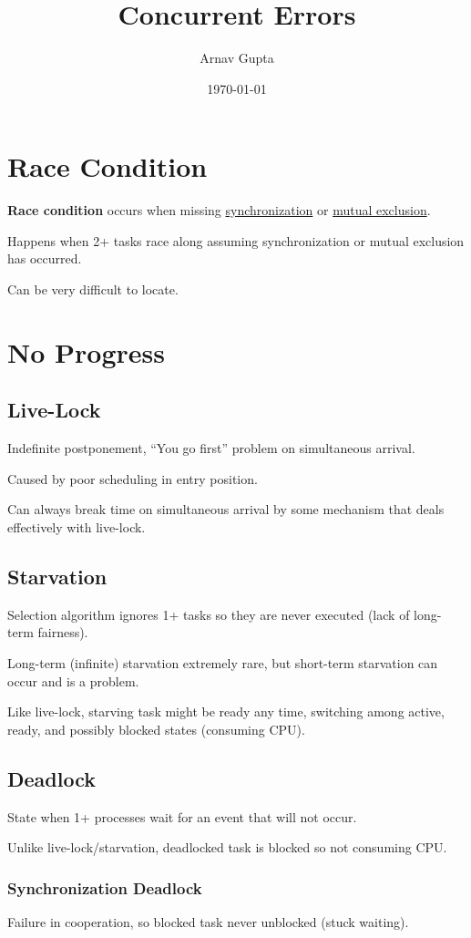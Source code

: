 \documentclass[11pt]{article}
\author{Arnav Gupta}
\date{\today}
\title{Concurrent Errors}
\begin{document}
\maketitle
\tableofcontents

\section{Race Condition}
\label{sec:org1addb70}
\textbf{Race condition} occurs when missing \uline{synchronization} or \uline{mutual exclusion}.

Happens when 2+ tasks race along assuming synchronization or mutual exclusion has occurred.

Can be very difficult to locate.
\section{No Progress}
\label{sec:orgc2e5e05}
\subsection{Live-Lock}
\label{sec:org8a3eda5}
Indefinite postponement, ``You go first'' problem on simultaneous arrival.

Caused by poor scheduling in entry position.

Can always break time on simultaneous arrival by some mechanism that deals effectively with
live-lock.
\subsection{Starvation}
\label{sec:org490fb36}
Selection algorithm ignores 1+ tasks so they are never executed (lack of long-term fairness).

Long-term (infinite) starvation extremely rare, but short-term starvation can occur and is a problem.

Like live-lock, starving task might be ready any time, switching among active, ready, and possibly
blocked states (consuming CPU).
\subsection{Deadlock}
\label{sec:org8567ccf}
State when 1+ processes wait for an event that will not occur.

Unlike live-lock/starvation, deadlocked task is blocked so not consuming CPU.
\subsubsection{Synchronization Deadlock}
\label{sec:orgb9192fd}
Failure in cooperation, so blocked task never unblocked (stuck waiting).
\end{document}
